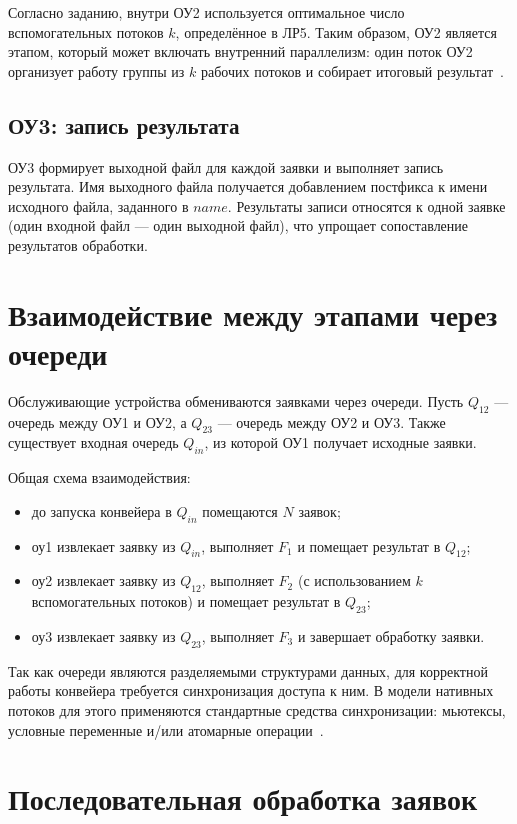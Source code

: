 Согласно заданию, внутри ОУ2 используется оптимальное число вспомогательных потоков $k$, определённое в ЛР5.
Таким образом, ОУ2 является этапом, который может включать внутренний параллелизм: один поток ОУ2 организует работу группы из $k$ рабочих потоков и собирает итоговый результат~\cite{cpp_standard}.

\subsection{ОУ3: запись результата}
ОУ3 формирует выходной файл для каждой заявки и выполняет запись результата.
Имя выходного файла получается добавлением постфикса к имени исходного файла, заданного в $name$.
Результаты записи относятся к одной заявке (один входной файл --- один выходной файл), что упрощает сопоставление результатов обработки.

\section{Взаимодействие между этапами через очереди}

Обслуживающие устройства обмениваются заявками через очереди.
Пусть $Q_{12}$ --- очередь между ОУ1 и ОУ2, а $Q_{23}$ --- очередь между ОУ2 и ОУ3.
Также существует входная очередь $Q_{in}$, из которой ОУ1 получает исходные заявки.

Общая схема взаимодействия:
\begin{itemize}
	\item до запуска конвейера в $Q_{in}$ помещаются $N$ заявок;
	\item оу1 извлекает заявку из $Q_{in}$, выполняет $F_1$ и помещает результат в $Q_{12}$;
	\item оу2 извлекает заявку из $Q_{12}$, выполняет $F_2$ (с использованием $k$ вспомогательных потоков) и помещает результат в $Q_{23}$;
	\item оу3 извлекает заявку из $Q_{23}$, выполняет $F_3$ и завершает обработку заявки.
\end{itemize}

Так как очереди являются разделяемыми структурами данных, для корректной работы конвейера требуется синхронизация доступа к ним.
В модели нативных потоков для этого применяются стандартные средства синхронизации: мьютексы, условные переменные и/или атомарные операции~\cite{cpp_standard}.

\section{Последовательная обработка заявок}

